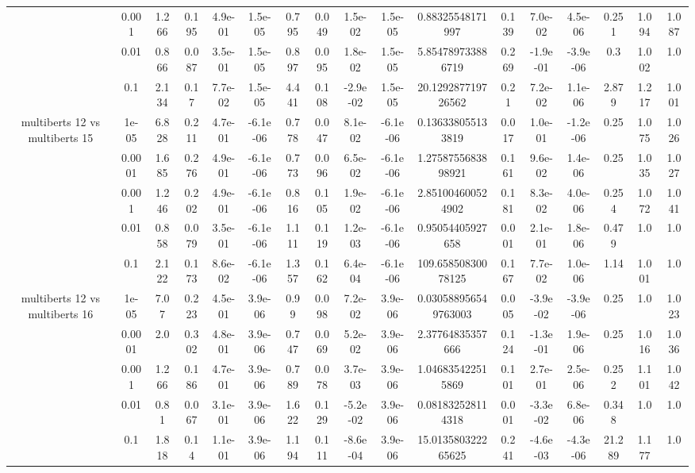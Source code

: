\begin{tabular}{|c|c|c|c|c|c|c|c|c|c|c|c|c|c|c|c|c|}
 & 0.001 & 1.266 & 0.195 & 4.9e-01 & 1.5e-05 & 0.795 & 0.049 & 1.5e-02 & 1.5e-05 & 0.88325548171997 & 0.139 & 7.0e-02 & 4.5e-06 & 0.251 & 1.094 & 1.087 \\
 & 0.01 & 0.866 & 0.087 & 3.5e-01 & 1.5e-05 & 0.897 & 0.095 & 1.8e-02 & 1.5e-05 & 5.854789733886719 & 0.269 & -1.9e-01 & -3.9e-06 & 0.3 & 1.002 & 1.0 \\
 & 0.1 & 2.134 & 0.17 & 7.7e-02 & 1.5e-05 & 4.441 & 0.108 & -2.9e-02 & 1.5e-05 & 20.129287719726562 & 0.21 & 7.2e-02 & 1.1e-06 & 2.879 & 1.217 & 1.001 \\
\hline
\multirow{5}{*}{multiberts 12 vs multiberts 15} & 1e-05 & 6.828 & 0.211 & 4.7e-01 & -6.1e-06 & 0.778 & 0.047 & 8.1e-02 & -6.1e-06 & 0.136338055133819 & 0.017 & 1.0e-01 & -1.2e-06 & 0.25 & 1.075 & 1.026 \\
 & 0.0001 & 1.685 & 0.276 & 4.9e-01 & -6.1e-06 & 0.773 & 0.096 & 6.5e-02 & -6.1e-06 & 1.2758755683898921 & 0.161 & 9.6e-02 & 1.4e-06 & 0.25 & 1.035 & 1.027 \\
 & 0.001 & 1.246 & 0.202 & 4.9e-01 & -6.1e-06 & 0.816 & 0.105 & 1.9e-02 & -6.1e-06 & 2.851004600524902 & 0.181 & 8.3e-02 & 4.0e-06 & 0.254 & 1.072 & 1.041 \\
 & 0.01 & 0.858 & 0.079 & 3.5e-01 & -6.1e-06 & 1.111 & 0.119 & 1.2e-03 & -6.1e-06 & 0.95054405927658 & 0.001 & 2.1e-01 & 1.8e-06 & 0.479 & 1.0 & 1.0 \\
 & 0.1 & 2.122 & 0.173 & 8.6e-02 & -6.1e-06 & 1.357 & 0.162 & 6.4e-04 & -6.1e-06 & 109.65850830078125 & 0.167 & 7.7e-02 & 1.0e-06 & 1.14 & 1.001 & 1.0 \\
\hline
\multirow{5}{*}{multiberts 12 vs multiberts 16} & 1e-05 & 7.07 & 0.223 & 4.5e-01 & 3.9e-06 & 0.99 & 0.098 & 7.2e-02 & 3.9e-06 & 0.030588956549763003 & 0.005 & -3.9e-02 & -3.9e-06 & 0.25 & 1.0 & 1.023 \\
 & 0.0001 & 2.0 & 0.302 & 4.8e-01 & 3.9e-06 & 0.747 & 0.069 & 5.2e-02 & 3.9e-06 & 2.37764835357666 & 0.124 & -1.3e-01 & 1.9e-06 & 0.25 & 1.016 & 1.036 \\
 & 0.001 & 1.266 & 0.186 & 4.7e-01 & 3.9e-06 & 0.789 & 0.078 & 3.7e-03 & 3.9e-06 & 1.046835422515869 & 0.101 & 2.7e-01 & 2.5e-06 & 0.252 & 1.101 & 1.042 \\
 & 0.01 & 0.81 & 0.067 & 3.1e-01 & 3.9e-06 & 1.622 & 0.129 & -5.2e-02 & 3.9e-06 & 0.081832528114318 & 0.001 & -3.3e-02 & 6.8e-06 & 0.348 & 1.0 & 1.0 \\
 & 0.1 & 1.818 & 0.14 & 1.1e-01 & 3.9e-06 & 1.194 & 0.111 & -8.6e-04 & 3.9e-06 & 15.013580322265625 & 0.241 & -4.6e-03 & -4.3e-06 & 21.289 & 1.177 & 1.0 \\

\end{tabular}
